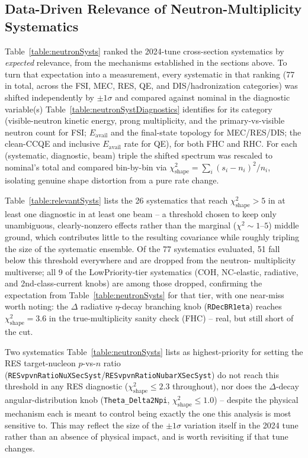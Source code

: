 \subsection{Data-Driven Relevance of Neutron-Multiplicity Systematics}
\label{sec:relevantSystsDataDriven}

Table~\ref{table:neutronSysts} ranked the 2024-tune cross-section
systematics by \emph{expected} relevance, from the mechanisms established
in the sections above. To turn that expectation into a measurement, every
systematic in that ranking (77 in total, across the FSI, MEC, RES, QE, and
DIS/hadronization categories) was shifted independently by
$\pm1\sigma$ and compared against nominal in the diagnostic variable(s)
Table~\ref{table:neutronSystDiagnostics} identifies for its category
(visible-neutron kinetic energy, prong multiplicity, and the
primary-vs-visible neutron count for FSI; $E_{\mathrm{avail}}$ and the
final-state topology for MEC/RES/DIS; the clean-CCQE and inclusive
$E_{\mathrm{avail}}$ rate for QE), for both FHC and RHC. For each
(systematic, diagnostic, beam) triple the shifted spectrum was rescaled to
nominal's total and compared bin-by-bin via
$\chi^2_{\mathrm{shape}} = \sum_i (s_i-n_i)^2/n_i$, isolating genuine shape
distortion from a pure rate change.

Table~\ref{table:relevantSysts} lists the 26 systematics that reach
$\chi^2_{\mathrm{shape}} > 5$ in at least one diagnostic in at least one
beam -- a threshold chosen to keep only unambiguous, clearly-nonzero
effects rather than the marginal ($\chi^2\sim1$--$5$) middle ground, which
contributes little to the resulting covariance while roughly tripling the
size of the systematic ensemble. Of the 77 systematics evaluated, 51 fall
below this threshold everywhere and are dropped from the neutron-
multiplicity multiverse; all 9 of the LowPriority-tier systematics (COH,
NC-elastic, radiative, and 2nd-class-current knobs) are among those
dropped, confirming the expectation from
Table~\ref{table:neutronSysts} for that tier, with one near-miss worth
noting: the $\Delta$ radiative $\eta$-decay branching knob (\texttt{RDecBR1eta})
reaches $\chi^2_{\mathrm{shape}}=3.6$ in the true-multiplicity sanity check
(FHC) -- real, but still short of the cut.

Two systematics Table~\ref{table:neutronSysts} lists as highest-priority
for setting the RES target-nucleon $p$-vs-$n$ ratio
(\texttt{RESvpvnRatioNuXSecSyst}/\texttt{RESvpvnRatioNubarXSecSyst}) do not
reach this threshold in any RES diagnostic ($\chi^2_{\mathrm{shape}}\leq2.3$
throughout), nor does the $\Delta$-decay angular-distribution knob
(\texttt{Theta\_Delta2Npi}, $\chi^2_{\mathrm{shape}}\leq1.0$) -- despite the
physical mechanism each is meant to control being exactly the one this
analysis is most sensitive to. This may reflect the size of the
$\pm1\sigma$ variation itself in the 2024 tune rather than an absence of
physical impact, and is worth revisiting if that tune changes.

